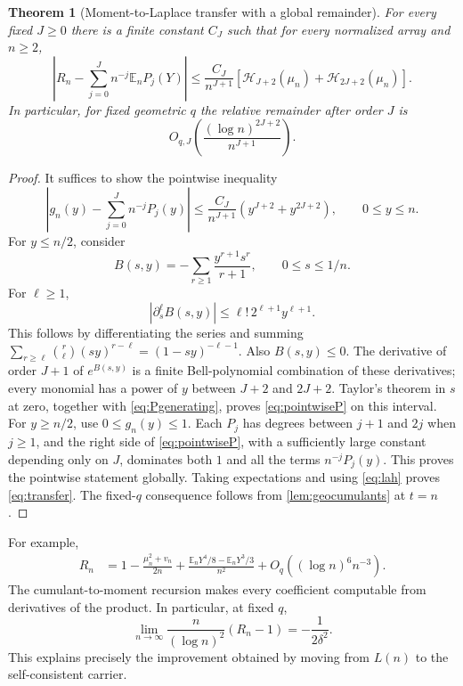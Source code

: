 \documentclass[11pt,a4paper]{article}
\numberwithin{equation}{section}
\newtheorem{theorem}{Theorem}[section]
\theoremstyle{definition}\newtheorem{definition}[theorem]{Definition}
\theoremstyle{remark}\newtheorem{remark}[theorem]{Remark}
\newcommand{\E}{\mathbb E}
\newcommand{\Lah}{\mathcal H}
\begin{document}
\begin{theorem}[Moment-to-Laplace transfer with a global remainder]\label{thm:transfer}
For every fixed $J\ge0$ there is a finite constant $C_J$ such that for every normalized array and $n\ge2$,
\begin{equation}\label{eq:transfer}
 \left|R_n-\sum_{j=0}^J n^{-j}\E_nP_j(Y)\right|
 \le\frac{C_J}{n^{J+1}}
       \left[\Lah_{J+2}(\mu_n)+\Lah_{2J+2}(\mu_n)\right].
\end{equation}
In particular, for fixed geometric $q$ the relative remainder after order $J$ is
\begin{equation}\label{eq:transfergeometric}
 O_{q,J}\!\left(\frac{(\log n)^{2J+2}}{n^{J+1}}\right).
\end{equation}
\end{theorem}
\begin{proof}
It suffices to show the pointwise inequality
\begin{equation}\label{eq:pointwiseP}
 \left|g_n(y)-\sum_{j=0}^Jn^{-j}P_j(y)\right|
 \le\frac{C_J}{n^{J+1}}(y^{J+2}+y^{2J+2}),\qquad 0\le y\le n.
\end{equation}
For $y\le n/2$, consider
\[
 B(s,y)=-\sum_{r\ge1}\frac{y^{r+1}s^r}{r+1},\qquad
 0\le s\le1/n.
\]
For $\ell\ge1$,
\[
 |\partial_s^\ell B(s,y)|
 \le\ell!\,2^{\ell+1}y^{\ell+1}.
\]
This follows by differentiating the series and summing
$\sum_{r\ge\ell}\binom r\ell(sy)^{r-\ell}=(1-sy)^{-\ell-1}$.
Also $B(s,y)\le0$. The derivative of order $J+1$ of $e^{B(s,y)}$ is a finite Bell-polynomial combination of these derivatives; every monomial has a power of $y$ between $J+2$ and $2J+2$. Taylor's theorem in $s$ at zero, together with \eqref{eq:Pgenerating}, proves \eqref{eq:pointwiseP} on this interval.
For $y\ge n/2$, use $0\le g_n(y)\le1$. Each $P_j$ has degrees between $j+1$ and $2j$ when $j\ge1$, and the right side of \eqref{eq:pointwiseP}, with a sufficiently large constant depending only on $J$, dominates both $1$ and all the terms $n^{-j}P_j(y)$. This proves the pointwise statement globally. Taking expectations and using \eqref{eq:lah} proves \eqref{eq:transfer}. The fixed-$q$ consequence follows from \cref{lem:geocumulants} at $t=n$.
\end{proof}

For example,
\begin{align}\label{eq:firstlaplace}
 R_n&=1-\frac{\mu_n^2+v_n}{2n}
 +\frac{\E_nY^4/8-\E_nY^3/3}{n^2}
 +O_q((\log n)^6n^{-3}).
\end{align}
The cumulant-to-moment recursion makes every coefficient computable from derivatives of the product. In particular, at fixed $q$,
\begin{equation}\label{eq:laplacesharp}
 \lim_{n\to\infty}\frac{n}{(\log n)^2}(R_n-1)
       =-\frac1{2\delta^2}.
\end{equation}
This explains precisely the improvement obtained by moving from $L(n)$ to the self-consistent carrier.
\end{document}
